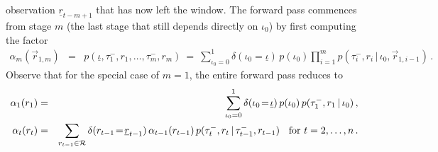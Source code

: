 \documentclass[a4paper]{article}
\newcommand{\ui}{\underline{\iota}}
\newcommand{\ur}{\underline{r}}
\newcommand{\vr}{\vec{r}}
\newcommand{\tm}{\tau^{-}}
\begin{document}
observation $\ur_{t-m+1}$ that has now left the window.
The forward pass commences from stage $m$ (the last stage that still depends directly on $\iota_0$) by first computing the factor
\begin{eqnarray}
\alpha_m(\vr_{1,m}) & = & p(\ui,\tm_1,r_1,\ldots,\tm_m,r_m)
~=~
\sum_{\iota_0=0}^{1}\delta(\iota_0\!=\!\ui)\,
p(\iota_0)\prod_{i=1}^{m}p(\tm_i,r_i\,|\,\iota_0,\vr_{1,i-1})\,.
\label{eq:fwd-pass-m0}
\end{eqnarray}
Observe that for the special case of $m=1$, the entire forward pass reduces to
\begin{eqnarray}
\alpha_1(r_1) & = &  \sum_{\iota_0=0}^{1}\delta(\iota_0\!=\!\ui)\,
p(\iota_0)\,p(\tm_1,r_1\,|\,\iota_0)\,,
\nonumber\\
\alpha_{t}(r_{t}) & = &
\sum_{r_{t-1}\in{\cal R}} \delta(r_{t-1}\!=\!\ur_{t-1})\,\alpha_{t-1}(r_{t-1})
\,p(\tm_{t},r_{t}\,|\,\tm_{t-1},r_{t-1})
\hspace*{2mm}\mbox{ for $t=2,\ldots,n$}
\,.
\end{eqnarray}
\end{document}
